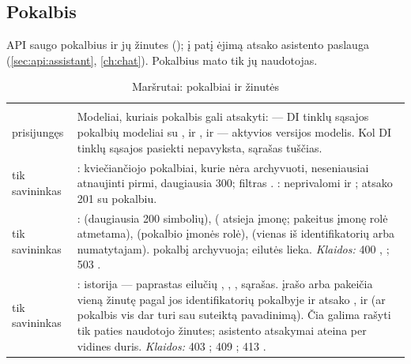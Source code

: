 \subsection{Pokalbis}\label{sec:api:chat}

API saugo pokalbius ir jų žinutes (); į patį ėjimą atsako asistento
paslauga (\cref{sec:api:assistant}, \cref{ch:chat}). Pokalbius mato tik jų naudotojas.

\begin{xltabular}{\textwidth}{@{}L{19mm}Y@{}}
\caption{Maršrutai: pokalbiai ir žinutės}\label{tab:api:chat}\\
\toprule {} &  \\ \midrule \endfirsthead
\toprule {} &  \\ \midrule \endhead
\bottomrule \endlastfoot
{}
prisijungęs & Modeliai, kuriais pokalbis gali atsakyti:  --- DI tinklų sąsajos
  pokalbių modeliai su ,  ir , ir  --- aktyvios
   versijos modelis. Kol DI tinklų sąsajos pasiekti nepavyksta, sąrašas
  tuščias. \\
\addlinespace
{}
tik savininkas & : kviečiančiojo pokalbiai, kurie nėra archyvuoti, neseniausiai
  atnaujinti pirmi, daugiausia 300; filtras . : neprivalomi
   ir ; atsako 201 su pokalbiu. \\
\addlinespace
{}
tik savininkas & :  (daugiausia 200 simbolių), 
  ( atsieja įmonę; pakeitus įmonę rolė atmetama),  (pokalbio įmonės
  rolė),  (vienas iš  identifikatorių arba 
  numatytajam).  pokalbį archyvuoja; eilutės lieka. \emph{Klaidos:} 400
  , ; 503 . \\
\addlinespace
{}
tik savininkas & : istorija --- paprastas eilučių , ,
  ,  sąrašas.  įrašo arba pakeičia vieną žinutę pagal jos
  identifikatorių pokalbyje ir atsako ,  ir  (ar pokalbis
  vis dar turi sau suteiktą pavadinimą). Čia galima rašyti tik paties naudotojo žinutes;
  asistento atsakymai ateina per vidines duris. \emph{Klaidos:} 403 ; 409
  ; 413 . \\
\end{xltabular}

